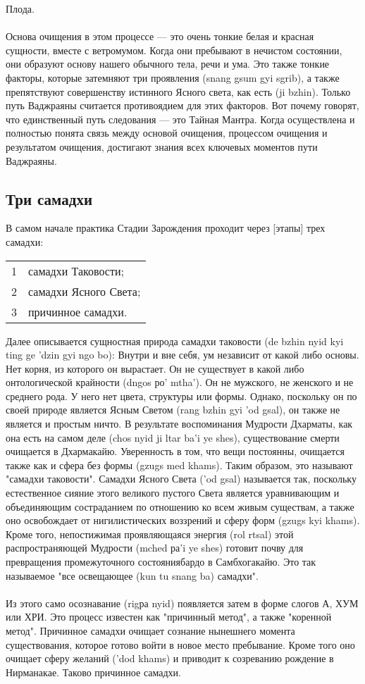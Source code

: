 \begin{siderules}
Плода.\\
\\
Основа очищения в этом процессе — это очень тонкие белая и красная сущности, вместе с
ветромумом. Когда они пребывают в нечистом состоянии, они образуют основу нашего
обычного тела, речи и ума. Это также тонкие факторы, которые затемняют три проявления
(snang gsum gyi sgrib), а также препятствуют совершенству истинного Ясного света, как есть
(ji bzhin). Только путь Ваджраяны считается противоядием для этих факторов. Вот почему
говорят, что единственный путь следования — это Тайная Мантра.
Когда осуществлена и полностью понята связь между основой очищения, процессом
очищения и результатом очищения, достигают знания всех ключевых моментов пути
Ваджраяны.
\end{siderules}

\subsection{Три самадхи}

В самом начале практика Стадии Зарождения проходит через [этапы] трех самадхи:\\

\begin{tabular}{ll}
1 & самадхи Таковости;\\
2 & самадхи Ясного Света;\\
3 & причинное самадхи.
\end{tabular}

Далее описывается сущностная природа самадхи таковости (de bzhin nyid kyi ting ge 'dzin
gyi ngo bo): Внутри и вне себя, ум независит от какой либо основы. Нет корня, из которого
он вырастает. Он не существует в какой либо онтологической крайности (dngos ро' mtha'). Он
не мужского, не женского и не среднего рода. У него нет цвета, структуры или формы.
Однако, поскольку он по своей природе является Ясным Светом (rang bzhin gyi 'od gsal), он
также не является и простым ничто. В результате воспоминания Мудрости Дхарматы, как
она есть на самом деле (chos nyid ji ltar ba'i ye shes), существование смерти очищается в
Дхармакайю. Уверенность в том, что вещи постоянны, очищается также как и сфера без
формы (gzugs med khams). Таким образом, это называют "самадхи таковости".
Самадхи Ясного Света ('od gsal) называется так, поскольку естественное сияние этого
великого пустого Света является уравнивающим и объединяющим состраданием по
отношению ко всем живым существам, а также оно освобождает от нигилистических
воззрений и сферу форм (gzugs kyi khams). Кроме того, непостижимая проявляющаяся
энергия (rol rtsal) этой распространяющей Мудрости (mched ра'i ye shes) готовит почву для
превращения промежуточного состояниябардо в Самбхогакайю. Это так называемое "все
освещающее (kun tu snang ba) самадхи".\\
\\
Из этого само осознавание (rigра nyid) появляется затем в форме слогов А, ХУМ или
ХРИ. Это процесс известен как "причинный метод", а также "коренной метод". Причинное
самадхи очищает сознание нынешнего момента существования, которое готово войти в
новое место пребывание. Кроме того оно очищает сферу желаний ('dod khams) и приводит к
созреванию рождение в Нирманакае. Таково причинное самадхи.

